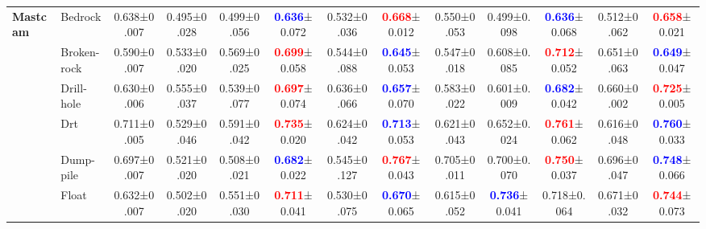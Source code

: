 \documentclass[10pt,twocolumn,letterpaper]{article}
\begin{document}
\begin{table*}[bt]
{\begin{tabular}{l@{}l@{}|c||ccccc||ccccc}
    \hline
    \multirow{10}[0]{*}{\textbf{Mastcam}} 
          & Bedrock & 0.638\footnotesize{±0.007}& 0.495\footnotesize{±0.028}& 0.499\footnotesize{±0.056}& \textcolor{blue}{\textbf{0.636}}\footnotesize{±0.072}& 0.532\footnotesize{±0.036}& \textcolor{red}{\textbf{0.668}}\footnotesize{±0.012}& 0.550\footnotesize{±0.053}& 0.499\footnotesize{±0.098}& \textcolor{blue}{\textbf{0.636}}\footnotesize{±0.068}& 0.512\footnotesize{±0.062}& \textcolor{red}{\textbf{0.658}}\footnotesize{±0.021} \\
          & Broken-rock & 0.590\footnotesize{±0.007}& 0.533\footnotesize{±0.020}& 0.569\footnotesize{±0.025}& \textcolor{red}{\textbf{0.699}}\footnotesize{±0.058}& 0.544\footnotesize{±0.088}& \textcolor{blue}{\textbf{0.645}}\footnotesize{±0.053}& 0.547\footnotesize{±0.018}& 0.608\footnotesize{±0.085}& \textcolor{red}{\textbf{0.712}}\footnotesize{±0.052}& 0.651\footnotesize{±0.063}& \textcolor{blue}{\textbf{0.649}}\footnotesize{±0.047} \\
          & Drill-hole & 0.630\footnotesize{±0.006}& 0.555\footnotesize{±0.037}& 0.539\footnotesize{±0.077}& \textcolor{red}{\textbf{0.697}}\footnotesize{±0.074}& 0.636\footnotesize{±0.066}& \textcolor{blue}{\textbf{0.657}}\footnotesize{±0.070}& 0.583\footnotesize{±0.022}& 0.601\footnotesize{±0.009}& \textcolor{blue}{\textbf{0.682}}\footnotesize{±0.042}& 0.660\footnotesize{±0.002}& \textcolor{red}{\textbf{0.725}}\footnotesize{±0.005}\\
          & Drt  & 0.711\footnotesize{±0.005}& 0.529\footnotesize{±0.046}& 0.591\footnotesize{±0.042}& \textcolor{red}{\textbf{0.735}}\footnotesize{±0.020}& 0.624\footnotesize{±0.042}& \textcolor{blue}{\textbf{0.713}}\footnotesize{±0.053}& 0.621\footnotesize{±0.043}& 0.652\footnotesize{±0.024}& \textcolor{red}{\textbf{0.761}}\footnotesize{±0.062}& 0.616\footnotesize{±0.048}& \textcolor{blue}{\textbf{0.760}}\footnotesize{±0.033} \\
          & Dump-pile & 0.697\footnotesize{±0.007}& 0.521\footnotesize{±0.020}& 0.508\footnotesize{±0.021}& \textcolor{blue}{\textbf{0.682}}\footnotesize{±0.022}& 0.545\footnotesize{±0.127}& \textcolor{red}{\textbf{0.767}}\footnotesize{±0.043}& 0.705\footnotesize{±0.011}& 0.700\footnotesize{±0.070}& \textcolor{red}{\textbf{0.750}}\footnotesize{±0.037}& 0.696\footnotesize{±0.047}& \textcolor{blue}{\textbf{0.748}}\footnotesize{±0.066} \\
          & Float & 0.632\footnotesize{±0.007}& 0.502\footnotesize{±0.020}& 0.551\footnotesize{±0.030}& \textcolor{red}{\textbf{0.711}}\footnotesize{±0.041}& 0.530\footnotesize{±0.075}& \textcolor{blue}{\textbf{0.670}}\footnotesize{±0.065}& 0.615\footnotesize{±0.052}& \textcolor{blue}{\textbf{0.736}}\footnotesize{±0.041}& 0.718\footnotesize{±0.064}& 0.671\footnotesize{±0.032}& \textcolor{red}{\textbf{0.744}}\footnotesize{±0.073} \\

\end{tabular}}
\end{table*}
\end{document}
